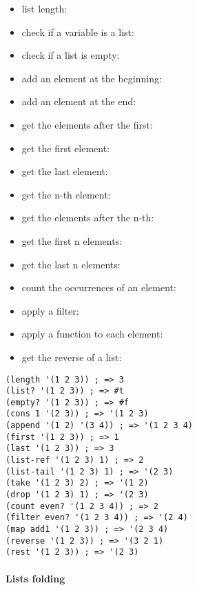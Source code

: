 \documentclass[a4paper,landscape,10pt]{article}
\begin{document}
\begin{multicols*}{2}
  \begin{itemize}
    \item list length: 
    \item check if a variable is a list: 
    \item check if a list is empty: 
    \item add an element at the beginning: 
    \item add an element at the end: 
    \item get the elements after the first: 
    \item get the first element: 
    \item get the last element: 
    \item get the n-th element: 
    \item get the elements after the n-th: 
    \item get the first n elements: 
    \item get the last n elements: 
    \item count the occurrences of an element: 
    \item apply a filter: 
    \item apply a function to each element: 
    \item get the reverse of a list: 
  \end{itemize}

  \breakcolumn

  \begin{lstlisting}[language=Racket]
(length '(1 2 3)) ; => 3
(list? '(1 2 3)) ; => #t
(empty? '(1 2 3)) ; => #f
(cons 1 '(2 3)) ; => '(1 2 3)
(append '(1 2) '(3 4)) ; => '(1 2 3 4)
(first '(1 2 3)) ; => 1
(last '(1 2 3)) ; => 3
(list-ref '(1 2 3) 1) ; => 2
(list-tail '(1 2 3) 1) ; => '(2 3)
(take '(1 2 3) 2) ; => '(1 2)
(drop '(1 2 3) 1) ; => '(2 3)
(count even? '(1 2 3 4)) ; => 2
(filter even? '(1 2 3 4)) ; => '(2 4)
(map add1 '(1 2 3)) ; => '(2 3 4)
(reverse '(1 2 3)) ; => '(3 2 1)
(rest '(1 2 3)) ; => '(2 3)
\end{lstlisting}

  \paragraph{Lists folding}


\end{multicols*}
\end{document}
